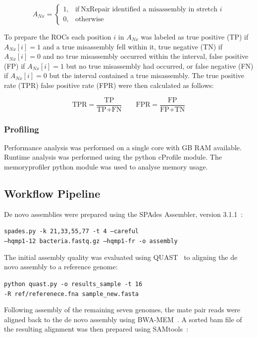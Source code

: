 \documentclass[fleqn,10pt]{wlpeerj}
\begin{document}
\begin{equation}
    A_{Nx}=
    \begin{cases}
      1, & \text{if}\ \text{NxRepair identified a misassembly in stretch $i$} \\
      0, & \text{otherwise}
    \end{cases}
  \label{eq:found}
\end{equation}

To prepare the ROCs each position $i$ in $A_{Nx}$ was labeled as true positive (TP) if $A_{Nx}[i] = 1$ and a true misassembly fell within it, true negative (TN) if $A_{Nx}[i] = 0$ and no true misassembly occurred within the interval, false positive (FP) if $A_{Nx}[i] = 1$ but no true misassembly had occurred, or false negative (FN) if $A_{Nx}[i] = 0$ but the interval contained a true misassembly. The true positive rate (TPR) false positive rate (FPR) were then calculated as follows:

\begin{equation}
\text{TPR} = \frac{\text{TP}}{\text{TP} + \text{FN}} \qquad \text{FPR} = \frac{\text{FP}}{\text{FP} + \text{TN}}
\label{eq:tpr}
\end{equation} 

\subsubsection*{Profiling}
Performance analysis was performed on a single core with GB RAM available. Runtime analysis was performed using the python cProfile module. The memoryprofiler python module was used to analyse memory usage.

\subsection*{Workflow Pipeline}
De novo assemblies were prepared using the SPAdes Assembler, version 3.1.1~\citep{Bankevich2012}:

\texttt{spades.py -k 21,33,55,77 -t 4 --careful \\ --hqmp1-12 bacteria.fastq.gz  --hqmp1-fr -o assembly}

The initial assembly quality was evaluated using QUAST~\citep{gurevich2013} to aligning the de novo assembly to a reference genome:

\texttt{python quast.py -o results\_sample -t 16 \\  -R ref/referenece.fna sample\_new.fasta }

Following assembly of the remaining seven genomes, the mate pair reads were aligned back to the de novo assembly using BWA-MEM~\citep{li2013}. A sorted bam file of the resulting alignment was then prepared using SAMtools~\citep{li2009}: 
\end{document}
